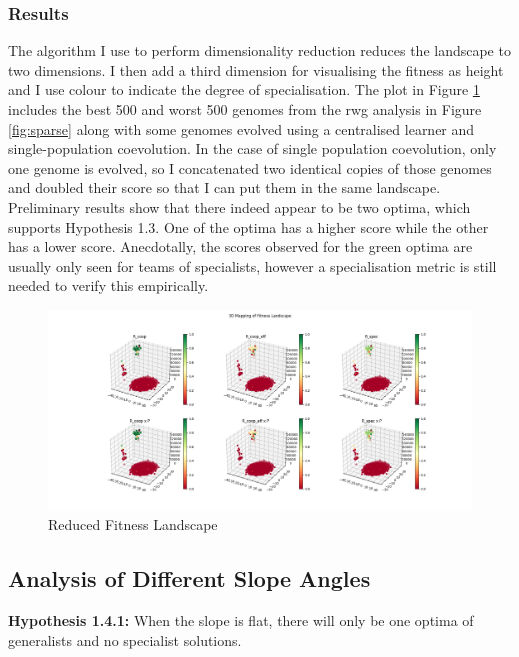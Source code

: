 \documentclass[12pt]{article}
\begin{document}
\subsubsection{Results}

The algorithm I use to perform dimensionality reduction reduces the landscape to two dimensions.
I then add a third dimension for visualising the fitness as height and I use colour to indicate the degree of specialisation.
The plot in Figure \ref{fig:tsne} includes the best 500 and worst 500 genomes from the rwg analysis in Figure \ref{fig:sparse} along with some genomes evolved using a centralised learner and single-population coevolution.
In the case of single population coevolution, only one genome is evolved, so I concatenated two identical copies of those genomes and doubled their score so that I can put them in the same landscape.\\

Preliminary results show that there indeed appear to be two optima, which supports Hypothesis 1.3.
One of the optima has a higher score while the other has a lower score.
Anecdotally, the scores observed for the green optima are usually only seen for teams of specialists, however a specialisation metric is still needed to verify this empirically.\\

\begin{figure}[h]
\centering
\includegraphics[width=1.0\textwidth]{tsne.png}
\caption{Reduced Fitness Landscape}
\label{fig:tsne}
\end{figure}

\subsection{Analysis of Different Slope Angles}

\textbf{Hypothesis 1.4.1:} When the slope is flat, there will only be one optima of generalists and no specialist solutions.\\
\end{document}
